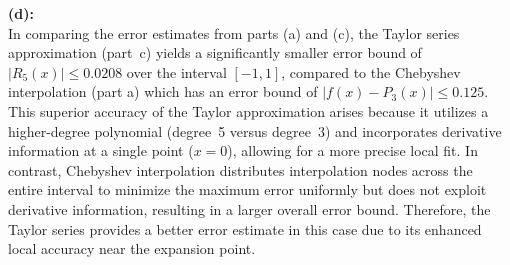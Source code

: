 \documentclass{article}
\begin{document}
\textbf{(d): }
\\
In comparing the error estimates from parts (a) and (c), the Taylor series approximation (part~c) yields a significantly smaller error bound of \( |R_5(x)| \leq 0.0208 \) over the interval \([-1, 1]\), 
compared to the Chebyshev interpolation (part a) which has an error bound of \( |f(x) - P_3(x)| \leq 0.125 \). 
This superior accuracy of the Taylor approximation arises because it utilizes a higher-degree polynomial (degree~5 versus degree~3) and incorporates derivative information at a single point (\(x=0\)), allowing for a more precise local fit. 
In contrast, Chebyshev interpolation distributes interpolation nodes across the entire interval to minimize the maximum error uniformly but does not exploit derivative information, resulting in a larger overall error bound. 
Therefore, the Taylor series provides a better error estimate in this case due to its enhanced local accuracy near the expansion point.
\end{document}
